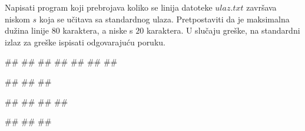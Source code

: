\begin{Exercise}[label=p3_04] 
 Napisati program koji prebrojava koliko se linija datoteke $ulaz.txt$ završava niskom $s$ 
 koja se učitava sa standardnog ulaza. 
  Pretpostaviti da je maksimalna dužina linije $80$ karaktera, a niske s $20$ karaktera.
 U slučaju greške, na standardni izlaz za greške ispisati odgovarajuću poruku.

\begin{miditest}
\begin{upotreba}{1}
##
##
##
##
##
##
##

#\naslovInt#
##
##
\end{upotreba}
\end{miditest}
\begin{miditest}
\begin{upotreba}{2}
##
##
##
##

#\naslovInt#
##
##
\end{upotreba}
\end{miditest}
\end{Exercise}
\begin{Answer}[ref=p3_04]
\end{Answer}


